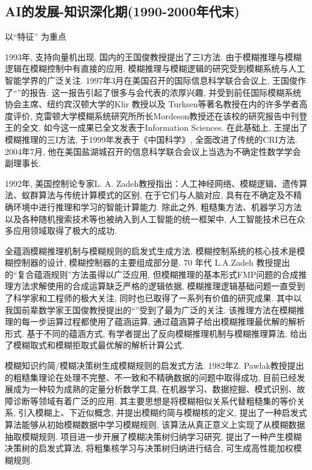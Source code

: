 \subsection{AI的发展-知识深化期(1990-2000年代末)}
以“特征” 为重点

      1993年, 支持向量机出现.  国内的王国俊教授提出了三I方法.  由于模糊推理与模糊逻辑在模糊控制中有直接的应用, 模糊推理与模糊逻辑的研究受到模糊系统与人工智能学界的广泛关注. 1997年3月在美国召开的国际信息科学联合会议上, 王国俊作了“”的报告. 这一报告引起了很多与会代表的浓厚兴趣, 并受到前任国际模糊系统协会主席、纽约宾汉顿大学的Klir 教授以及 Turksen等著名教授在内的许多学者高度评价, 克雷顿大学模糊系统研究所所长Mordeson教授还在该校的研究报告中刊登王的全文. 如今这一成果已全文发表于Information Sciences.
       在此基础上, 王提出了模糊推理的三I方法, 于1999年发表于《中国科学》, 全面改进了传统的CRI方法. 2004年7月, 他在美国盐湖城召开的信息科学联合会议上当选为不确定性数学学会副理事长.

      1992年, 美国控制论专家L. A. Zadeh教授指出：人工神经网络、模糊逻辑、遗传算法、蚁群算法与传统计算模式的区别, 在于它们与人脑对应, 具有在不确定及不精确环境中进行推理和学习的智能计算能力. 除此之外, 粗糙集方法、机器学习方法以及各种随机搜索技术等也被纳入到人工智能的统一框架中, 人工智能技术已在众多应用领域取得了极大的成功.

      全蕴涵模糊推理机制与模糊规则的启发式生成方法.  模糊控制系统的核心技术是模糊控制器的设计,  模糊控制器的主要组成部分是. 70 年代 L.A.Zadeh 教授提出的“复合蕴涵规则”方法虽得以广泛应用, 但模糊推理的基本形式FMP问题的合成推理方法求解使用的合成运算缺乏严格的逻辑依据, 模糊推理逻辑基础问题一直受到了科学家和工程师的极大关注, 同时也已取得了一系列有价值的研究成果. 其中以我国前辈数学家王国俊教授提出的“”受到了最为广泛的关注. 该推理方法在模糊推理的每一步运算过程都使用了蕴涵运算, 通过蕴涵算子给出模糊推理最优解的解析形式. 基于不同的蕴涵方式, 有学者提出了反向模糊推理机制与模糊推理算法, 给出了模糊取式和模糊拒取式最优解的解析计算公式.

      模糊知识约简/模糊决策树生成模糊规则的启发式方法.  1982年Z. Pawlak教授提出的粗糙集理论在处理不完整、不一致和不精确数据的问题中取得成功, 目前已经发展成为一种较为成熟的定量分析数学工具, 在机器学习、数据挖掘、模式识别、故障诊断等领域有着广泛的应用. 其主要思想是将模糊相似关系代替粗糙集的等价关系, 引入模糊上、下近似概念, 并提出模糊约简与模糊核的定义, 提出了一种启发式算法能够从初始模糊数据中学习模糊规则, 该算法从真正意义上实现了从模糊数据抽取模糊规则. 项目进一步开展了模糊决策树归纳学习研究, 提出了一种产生模糊决策树的启发式算法, 将粗集核学习与决策树归纳进行结合, 可生成高性能加权模糊规则.

